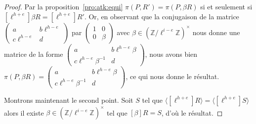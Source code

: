 \documentclass[10pt,a4paper]{book}
\theoremstyle{plain}
\theoremstyle{definition}
\theoremstyle{definition}
\theoremstyle{definition}
\theoremstyle{definition}
\theoremstyle{definition}
\theoremstyle{remark}
\theoremstyle{remark}
\theoremstyle{definition}
\begin{document}
\begin{proof}
Par la proposition~\ref{pro:atk:equi} $\pi(P,R')=\pi(P,
\beta R)$ si et seulement si $[\ell^{h+e}]\beta R=[\ell^{h+e}]R'$. Or, en 
observant que la conjugaison de la matrice $\left( \begin{smallmatrix}a & b 
\ell^{h-e} \\c  \ell^{h-e} & d \end{smallmatrix} \right)$ par $\left( 
\begin{smallmatrix}1 & 0 \\0 & \beta \end{smallmatrix} \right)$ avec $\beta \in
\left( \mathbb{Z}/\ell^{i-e} \mathbb{Z}\right)^{\times}$ nous donne une matrice de la 
forme $\left( \begin{smallmatrix}a & b \ell^{h-e} \beta \\c \ell^{h-e} \beta^{-1} &
 d \end{smallmatrix} \right)$, nous avons bien $\pi(P,\beta R)=\left( 
\begin{smallmatrix}a & b \ell^{h-e} \beta \\c \ell^{h-e} \beta^{-1} & d 
\end{smallmatrix} \right)$, ce qui nous donne le résultat.

Montrons maintenant le second point. Soit $S$ tel que $\langle [\ell^{h+e}]R 
\rangle =\langle [\ell^{h+e}]S \rangle$ alors il existe $\beta \in \left( 
\mathbb{Z}/\ell^{i-e} \mathbb{Z} \right)^{\times}$ tel que $[\beta] R= S$,
d'où le résultat.
\end{proof}
\end{document}

